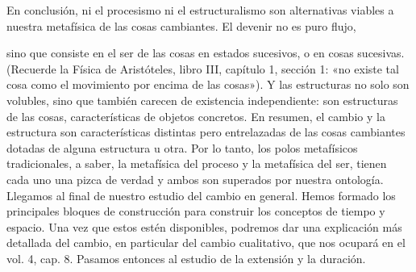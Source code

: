 \begin{justifying}
\begin{justifying}
En conclusión, ni el procesismo ni el estructuralismo son alternativas viables
a nuestra metafísica de las cosas cambiantes. El devenir no es puro flujo,

 sino que consiste en el ser de las cosas en estados sucesivos, o en cosas sucesivas.
(Recuerde la Física de Aristóteles, libro III, capítulo 1, sección 1: «no existe tal
cosa como el movimiento por encima de las cosas»). Y las estructuras no solo son
volubles, sino que también carecen de existencia independiente: son estructuras de
las cosas, características de objetos concretos. En resumen, el cambio y la estructura son
características distintas pero entrelazadas de las cosas cambiantes dotadas de
alguna estructura u otra. Por lo tanto, los polos metafísicos tradicionales,
a saber, la metafísica del proceso y la metafísica del ser, tienen cada uno una pizca de
verdad y ambos son superados por nuestra ontología.
Llegamos al final de nuestro estudio del cambio en general. Hemos
formado los principales bloques de construcción para construir los conceptos de tiempo
y espacio. Una vez que estos estén disponibles, podremos dar una
explicación más detallada del cambio, en particular del cambio cualitativo,
que nos ocupará en el vol. 4, cap. 8. Pasamos entonces al estudio de la
extensión y la duración.
\noindent
  \end{justifying}
\end{justifying}